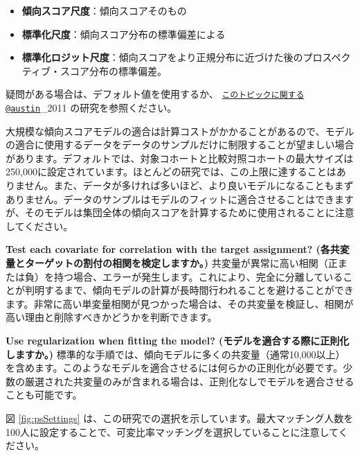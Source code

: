 \documentclass[
  11pt]{book}
\theoremstyle{definition}
\theoremstyle{definition}
\theoremstyle{definition}
\theoremstyle{definition}
\theoremstyle{remark}
\begin{document}
\begin{itemize}
\item
  \textbf{傾向スコア尺度}：傾向スコアそのもの
\item
  \textbf{標準化尺度}：傾向スコア分布の標準偏差による
\item
  \textbf{標準化ロジット尺度}：傾向スコアをより正規分布に近づけた後のプロスペクティブ・スコア分布の標準偏差。
\end{itemize}

疑問がある場合は、デフォルト値を使用するか、 \href{mailto:このトピックに関する@austin}{\nolinkurl{このトピックに関する@austin}}\_2011 の研究を参照ください。

大規模な傾向スコアモデルの適合は計算コストがかかることがあるので、モデルの適合に使用するデータをデータのサンプルだけに制限することが望ましい場合があります。デフォルトでは、対象コホートと比較対照コホートの最大サイズは250,000に設定されています。ほとんどの研究では、この上限に達することはありません。また、データが多ければ多いほど、より良いモデルになることもまずありません。データのサンプルはモデルのフィットに適合させることはできますが、そのモデルは集団全体の傾向スコアを計算するために使用されることに注意してください。

\textbf{Test each covariate for correlation with the target assignment? (各共変量とターゲットの割付の相関を検定しますか。)} 共変量が異常に高い相関（正または負）を持つ場合、エラーが発生します。これにより、完全に分離していることが判明するまで、傾向モデルの計算が長時間行われることを避けることができます。非常に高い単変量相関が見つかった場合は、その共変量を検証し、相関が高い理由と削除すべきかどうかを判断できます。

\textbf{Use regularization when fitting the model? (モデルを適合する際に正則化しますか。)} 標準的な手順では、傾向モデルに多くの共変量（通常10,000以上）を含めます。このようなモデルを適合させるには何らかの正則化が必要です。少数の厳選された共変量のみが含まれる場合は、正則化なしでモデルを適合させることも可能です。

図 \ref{fig:psSettings} は、この研究での選択を示しています。最大マッチング人数を100人に設定することで、可変比率マッチングを選択していることに注意してください。
\end{document}
